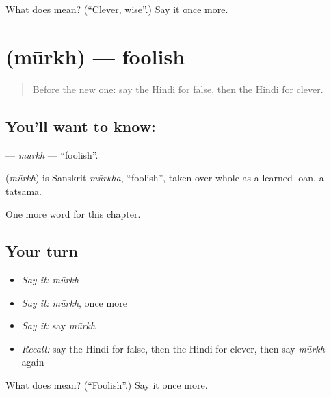 \begin{tcolorbox}[breakable,colback=teal!4,colframe=teal!35!black,title={Before you move on}]
What does  mean? (\textquotedblleft{}Clever, wise\textquotedblright{}.) Say it once more.
\end{tcolorbox}
\section[\texorpdfstring{\hi{मूर्ख} (mūrkh)}{मूर्ख (mūrkh)}]{ (mūrkh) — foolish}

\label{lesson:HI-C215-murkh}



\begin{quote}
Before the new one: say the Hindi for false, then the Hindi for clever.
\end{quote}

\subsection*{You'll want to know: }
\textbf{} — \emph{mūrkh} — \textquotedblleft{}foolish\textquotedblright{}.

\begin{cousinweb}
\textbf{} (\emph{mūrkh}) is Sanskrit \emph{mūrkha}, \textquotedblleft{}foolish\textquotedblright{}, taken over whole as a learned loan, a tatsama.
\end{cousinweb}

\begin{grammarlens}[title={What you've built}]
One more word for this chapter.
\end{grammarlens}

\subsection*{Your turn}
\begin{itemize}
\raggedright
  \item \emph{Say it:} \emph{mūrkh}
  \item \emph{Say it:} \emph{mūrkh}, once more
  \item \emph{Say it:} say \emph{mūrkh}
  \item \emph{Recall:} say the Hindi for false, then the Hindi for clever, then say \emph{mūrkh} again
\end{itemize}

\begin{tcolorbox}[breakable,colback=teal!4,colframe=teal!35!black,title={Before you move on}]
What does  mean? (\textquotedblleft{}Foolish\textquotedblright{}.) Say it once more.
\end{tcolorbox}
